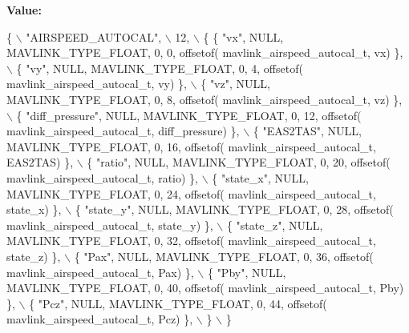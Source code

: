 {\bfseries Value\+:}
\begin{DoxyCode}
\{ \(\backslash\)
    \textcolor{stringliteral}{"AIRSPEED\_AUTOCAL"}, \(\backslash\)
    12, \(\backslash\)
    \{  \{ \textcolor{stringliteral}{"vx"}, NULL, MAVLINK_TYPE_FLOAT, 0, 0, offsetof(
      mavlink_airspeed_autocal_t, vx) \}, \(\backslash\)
         \{ \textcolor{stringliteral}{"vy"}, NULL, MAVLINK_TYPE_FLOAT, 0, 4, offsetof(
      mavlink_airspeed_autocal_t, vy) \}, \(\backslash\)
         \{ \textcolor{stringliteral}{"vz"}, NULL, MAVLINK_TYPE_FLOAT, 0, 8, offsetof(
      mavlink_airspeed_autocal_t, vz) \}, \(\backslash\)
         \{ \textcolor{stringliteral}{"diff\_pressure"}, NULL, MAVLINK_TYPE_FLOAT, 0, 12, offsetof(
      mavlink_airspeed_autocal_t, diff\_pressure) \}, \(\backslash\)
         \{ \textcolor{stringliteral}{"EAS2TAS"}, NULL, MAVLINK_TYPE_FLOAT, 0, 16, offsetof(
      mavlink_airspeed_autocal_t, EAS2TAS) \}, \(\backslash\)
         \{ \textcolor{stringliteral}{"ratio"}, NULL, MAVLINK_TYPE_FLOAT, 0, 20, offsetof(
      mavlink_airspeed_autocal_t, ratio) \}, \(\backslash\)
         \{ \textcolor{stringliteral}{"state\_x"}, NULL, MAVLINK_TYPE_FLOAT, 0, 24, offsetof(
      mavlink_airspeed_autocal_t, state\_x) \}, \(\backslash\)
         \{ \textcolor{stringliteral}{"state\_y"}, NULL, MAVLINK_TYPE_FLOAT, 0, 28, offsetof(
      mavlink_airspeed_autocal_t, state\_y) \}, \(\backslash\)
         \{ \textcolor{stringliteral}{"state\_z"}, NULL, MAVLINK_TYPE_FLOAT, 0, 32, offsetof(
      mavlink_airspeed_autocal_t, state\_z) \}, \(\backslash\)
         \{ \textcolor{stringliteral}{"Pax"}, NULL, MAVLINK_TYPE_FLOAT, 0, 36, offsetof(
      mavlink_airspeed_autocal_t, Pax) \}, \(\backslash\)
         \{ \textcolor{stringliteral}{"Pby"}, NULL, MAVLINK_TYPE_FLOAT, 0, 40, offsetof(
      mavlink_airspeed_autocal_t, Pby) \}, \(\backslash\)
         \{ \textcolor{stringliteral}{"Pcz"}, NULL, MAVLINK_TYPE_FLOAT, 0, 44, offsetof(
      mavlink_airspeed_autocal_t, Pcz) \}, \(\backslash\)
         \} \(\backslash\)
\}
\end{DoxyCode}
\mbox{\label{mavlink__msg__airspeed__autocal_8h_ae47d6195c8b5a9084b2c623f5e8a7677}} 

